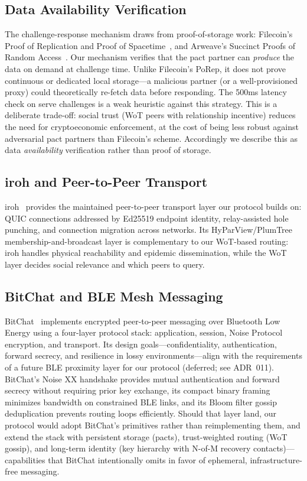 \documentclass[11pt,a4paper]{article}
\begin{document}
\subsection{Data Availability Verification}

The challenge-response mechanism draws from proof-of-storage work: Filecoin's Proof of Replication and Proof of Spacetime~\cite{filecoin}, and Arweave's Succinct Proofs of Random Access~\cite{arweave}. Our mechanism verifies that the pact partner can \emph{produce} the data on demand at challenge time. Unlike Filecoin's PoRep, it does not prove continuous or dedicated local storage---a malicious partner (or a well-provisioned proxy) could theoretically re-fetch data before responding. The 500ms latency check on serve challenges is a weak heuristic against this strategy. This is a deliberate trade-off: social trust (WoT peers with relationship incentive) reduces the need for cryptoeconomic enforcement, at the cost of being less robust against adversarial pact partners than Filecoin's scheme. Accordingly we describe this as data \emph{availability} verification rather than proof of storage.

\subsection{iroh and Peer-to-Peer Transport}

iroh~\cite{iroh} provides the maintained peer-to-peer transport layer our protocol builds on: QUIC connections addressed by Ed25519 endpoint identity, relay-assisted hole punching, and connection migration across networks. Its HyParView/PlumTree membership-and-broadcast layer is complementary to our WoT-based routing: iroh handles physical reachability and epidemic dissemination, while the WoT layer decides social relevance and which peers to query.

\subsection{BitChat and BLE Mesh Messaging}

BitChat~\cite{bitchat} implements encrypted peer-to-peer messaging over Bluetooth Low Energy using a four-layer protocol stack: application, session, Noise Protocol encryption, and transport. Its design goals---confidentiality, authentication, forward secrecy, and resilience in lossy environments---align with the requirements of a future BLE proximity layer for our protocol (deferred; see ADR~011). BitChat's Noise XX handshake provides mutual authentication and forward secrecy without requiring prior key exchange, its compact binary framing minimizes bandwidth on constrained BLE links, and its Bloom filter gossip deduplication prevents routing loops efficiently. Should that layer land, our protocol would adopt BitChat's primitives rather than reimplementing them, and extend the stack with persistent storage (pacts), trust-weighted routing (WoT gossip), and long-term identity (key hierarchy with N-of-M recovery contacts)---capabilities that BitChat intentionally omits in favor of ephemeral, infrastructure-free messaging.
\end{document}
